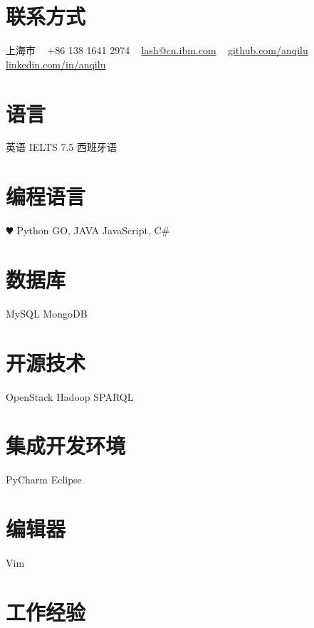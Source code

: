 \documentclass[]{friggeri-cv-cn} %
\begin{document}


\begin{aside} %
\section{联系方式}
上海市
~
+86 138 1641 2974
~
\href{mailto:lash@cn.ibm.com}{lash@cn.ibm.com}
~
\href{https://github.com/anqilu}{github.com/anqilu}
\href{https://www.linkedin.com/in/anqilu}{linkedin.com/in/anqilu}
\section{语言}
英语 IELTS 7.5
西班牙语
\section{编程语言}
{\color{red} $\varheartsuit$} Python
GO, JAVA
JavaScript, C\#
\section{数据库}
MySQL
MongoDB
\section{开源技术}
OpenStack
Hadoop
SPARQL
\section{集成开发环境}
PyCharm
Eclipse
\section{编辑器}
Vim
\end{aside}


\section{工作经验}
\end{document}

